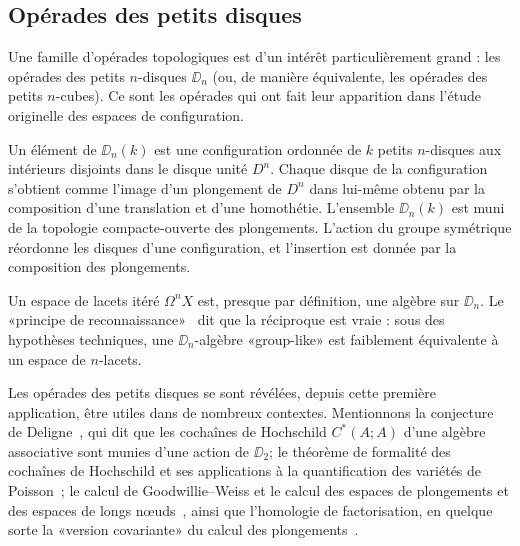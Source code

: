 \subsection*{Opérades des petits disques}

Une famille d'opérades topologiques est d'un intérêt particulièrement grand : les opérades des petits $n$-disques $\DD_{n}$ (ou, de manière équivalente, les opérades des petits $n$-cubes).
Ce sont les opérades qui ont fait leur apparition dans l'étude originelle des espaces de configuration.



Un élément de $\DD_{n}(k)$ est une configuration ordonnée de $k$ petits $n$-disques aux intérieurs disjoints dans le disque unité $D^{n}$.
Chaque disque de la configuration s'obtient comme l'image d'un plongement de $D^{n}$ dans lui-même obtenu par la composition d'une translation et d'une homothétie.
L'ensemble $\DD_{n}(k)$ est muni de la topologie compacte-ouverte des plongements.
L'action du groupe symétrique réordonne les disques d'une configuration, et l'insertion est donnée par la composition des plongements.

\begin{center}
  
\end{center}

Un espace de lacets itéré $\Omega^{n} X$ est, presque par définition, une algèbre sur $\DD_{n}$.
Le «principe de reconnaissance»~\cite{May1972,BoardmanVogt1973} dit que la réciproque est vraie : sous des hypothèses techniques, une $\DD_{n}$-algèbre «group-like» est faiblement équivalente à un espace de $n$-lacets.

Les opérades des petits disques se sont révélées, depuis cette première application, être utiles dans de nombreux contextes.
Mentionnons la conjecture de Deligne~\cite{KontsevichSoibelman2000,McClureSmith2002}, qui dit que les cochaînes de Hochschild $C^{*}(A;A)$ d'une algèbre associative sont munies d'une action de $\DD_{2}$; le théorème de formalité des cochaînes de Hochschild et ses applications à la quantification des variétés de Poisson~\cite{Kontsevich1999,Tamarkin1998,Kontsevich2003}; le calcul de Goodwillie--Weiss et le calcul des espaces de plongements et des espaces de longs nœuds~\cite{Sinha2006,LambrechtsTurchinVolic2010,AroneTurchin2014,DwyerHess2012,BoavidaWeiss2013}, ainsi que l'homologie de factorisation, en quelque sorte la «version covariante» du calcul des plongements~\cite{BeilinsonDrinfeld2004,Lurie2009,Lurie2016,AyalaFrancis2015,CostelloGwilliam2017}.

